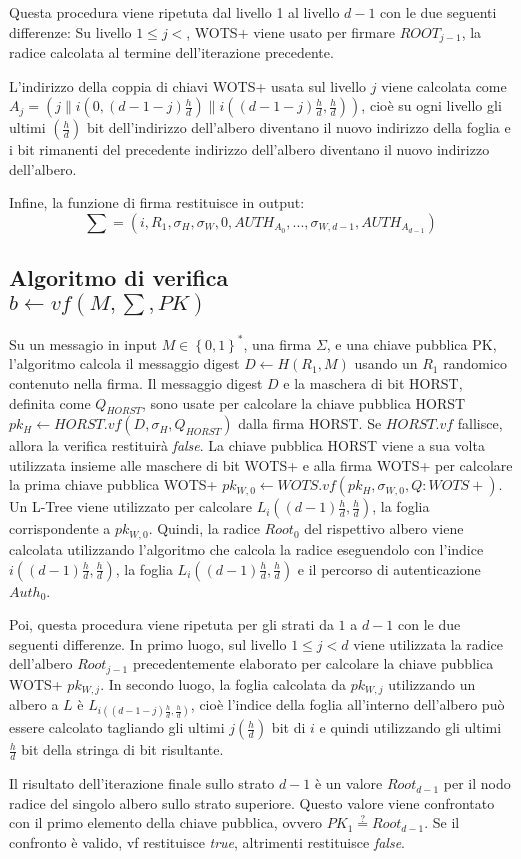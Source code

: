 Questa procedura viene ripetuta dal livello 1 al livello \(d - 1\) con le due seguenti differenze: Su livello \( 1 \leqslant j < \), WOTS+ viene usato per firmare \(ROOT_{j-1}\), la radice calcolata al termine dell'iterazione precedente.

L'indirizzo della coppia di chiavi WOTS+ usata sul livello \(j\) viene calcolata come \( A_j = (j\|i(0, (d - 1 - j)\frac{h}{d})\|i((d - 1 - j)\frac{h}{d}, \frac{h}{d})) \), cioè su ogni livello gli ultimi \((\frac{h}{d})\) bit dell'indirizzo dell'albero diventano il nuovo indirizzo della foglia e i bit rimanenti del precedente indirizzo dell'albero diventano il nuovo indirizzo dell'albero.

Infine, la funzione di firma restituisce in output:
\[ \sum = (i, R_1, \sigma_H, \sigma_W,0, AUTH_{A_0} , . . . , \sigma_{W,d-1}, AUTH_{A_{d-1}} ) \]

\subsection{Algoritmo di verifica\\\(b \leftarrow vf(M, \sum, PK)\)}
\label{sec:check_algorithm}
Su un messagio in input \( M \in \left\{0,1\right\}^* \), una firma \(\Sigma\), e una chiave pubblica PK, l'algoritmo calcola il messaggio digest \( D \leftarrow H(R_1,M) \) usando un \(R_1\) randomico contenuto nella firma. Il messaggio digest \(D\) e la maschera di bit HORST, definita come \(Q_{HORST}\), sono usate per calcolare la chiave pubblica HORST \( pk_H \leftarrow HORST.vf(D, \sigma_H, Q_{HORST}) \) dalla firma HORST. Se \(HORST.vf\) fallisce, allora la verifica restituirà \textit{false}. La chiave pubblica HORST viene a sua volta utilizzata insieme alle maschere di bit WOTS+ e alla firma WOTS+ per calcolare la prima chiave pubblica WOTS+ \(pk_{W,0} \leftarrow WOTS.vf(pk_H, \sigma_{W,0}, Q:{WOTS+})\). Un L-Tree viene utilizzato per calcolare \(L_i((d-1)\frac{h}{d},\frac{h}{d})\), la foglia corrispondente a \(pk_{W,0}\). Quindi, la radice \(Root_0\) del rispettivo albero viene calcolata utilizzando l'algoritmo che calcola la radice eseguendolo con l'indice \(i((d - 1)\frac{h}{d}, \frac{h}{d})\), la foglia \(L_i((d-1)\frac{h}{d},\frac{h}{d})\) e il percorso di autenticazione \(Auth_0\).

Poi, questa procedura viene ripetuta per gli strati da \(1\) a \(d - 1\) con le due seguenti differenze. In primo luogo, sul livello \(1 \leqslant j < d\) viene utilizzata la radice dell'albero \(Root_{j-1}\) precedentemente elaborato per calcolare la chiave pubblica WOTS+ \(pk_{W,j}\). In secondo luogo, la foglia calcolata da \(pk_{W,j}\) utilizzando un albero a \(L\) è \(L_{i((d-1-j)\frac{h}{d},\frac{h}{d})}\), cioè l'indice della foglia all'interno dell'albero può essere calcolato tagliando gli ultimi \(j(\frac{h}{d})\) bit di \(i\) e quindi utilizzando gli ultimi \(\frac{h}{d}\) bit della stringa di bit risultante.

Il risultato dell'iterazione finale sullo strato \(d - 1\) è un valore \(Root_{d-1}\) per il nodo radice del singolo albero sullo strato superiore. Questo valore viene confrontato con il primo elemento della chiave pubblica, ovvero \(PK_1 \overset{?}{=} Root_{d-1}\). Se il confronto è valido, vf restituisce \textit{true}, altrimenti restituisce \textit{false}.